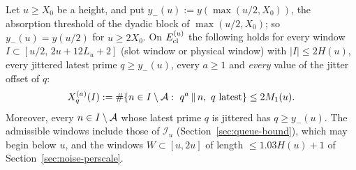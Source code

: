 \begin{corollary}\label{cor:increment}
Let $u\ge X_0$ be a height, and put $y_-(u):=y(\max(u/2,X_0))$, the absorption threshold of the dyadic block of
$\max(u/2,X_0)$; so $y_-(u)=y(u/2)$ for $u\ge2X_0$. On $E_{\mathrm{cl}}^{(u)}$ the following holds for every window
$I\subset[u/2,\,2u+12L_u+2]$ (slot window or physical window) with $|I|\le2H(u)$, every jittered latest prime
$q\ge y_-(u)$, every $a\ge1$ and \emph{every} value of the jitter offset of $q$:
\[
X^{(a)}_q(I):=\#\{n\in I\setminus\Abs:\ q^a\,\|\,n,\ q\text{ latest}\}\le2M_1(u).
\]
Moreover, every $n\in I\setminus\mathcal{A}$ whose latest prime $q$ is jittered has $q\ge y_-(u)$. The admissible windows include
those of $\mathcal I_u$ (Section~\ref{sec:queue-bound}), which may begin below $u$, and the windows $W\subset[u,2u]$ of
length $\le1.03H(u)+1$ of Section~\ref{sec:noise-perscale}.
\end{corollary}

